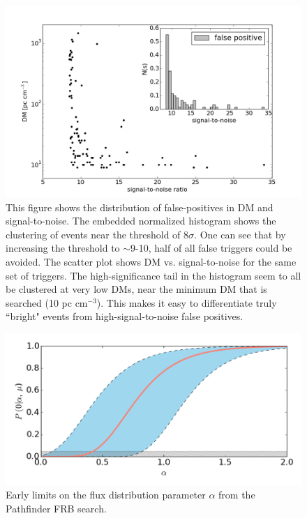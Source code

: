 \begin{figure}[!h]
\label{fig-scatterhist}
\begin{center}
\includegraphics[trim={0in 0in 0in 0in}, scale=0.5]
{./figures/beamforming/dm_dist_falsepositives.png}
\vspace{0.0cm}
\caption[abc]{This figure shows the distribution 
     of false-positives in DM and signal-to-noise. The 
     embedded normalized histogram shows the clustering of events 
     near the threshold of 8$\sigma$. One can see that by 
     increasing the threshold to $\sim$9-10, half of all 
     false triggers could be avoided. The scatter plot shows 
     DM vs. signal-to-noise for the same set of triggers. The 
     high-significance tail in the histogram seem to all be clustered 
     at very low DMs, near the minimum DM that is searched 
     (10 pc cm$^{-3}$). This makes it easy to differentiate truly 
     ``bright" events from high-signal-to-noise false positives.}
\end{center}
\end{figure}

\begin{figure}[!h]
\label{fig-scatterhist}
\begin{center}
\includegraphics[trim={0in 0in 0in 0in}, scale=0.65]
{./figures/beamforming/alpha_limits.png}
\vspace{0.0cm}
\caption[abc]{Early limits on the flux distribution 
     parameter $\alpha$ from the Pathfinder 
     FRB search. }
\end{center}
\end{figure}

